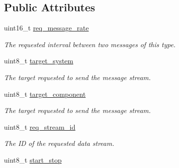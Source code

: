 \subsection*{Public Attributes}
\begin{DoxyCompactItemize}
\item 
\hypertarget{struct____mavlink__request__data__stream__t_a7be3844fa9c61b28b51dbd1fc452c1f0}{uint16\+\_\+t \hyperlink{struct____mavlink__request__data__stream__t_a7be3844fa9c61b28b51dbd1fc452c1f0}{req\+\_\+message\+\_\+rate}}\label{struct____mavlink__request__data__stream__t_a7be3844fa9c61b28b51dbd1fc452c1f0}

\begin{DoxyCompactList}\small\item\em The requested interval between two messages of this type. \end{DoxyCompactList}\item 
\hypertarget{struct____mavlink__request__data__stream__t_ad18b3be12f7ec2056677acd15c286d0a}{uint8\+\_\+t \hyperlink{struct____mavlink__request__data__stream__t_ad18b3be12f7ec2056677acd15c286d0a}{target\+\_\+system}}\label{struct____mavlink__request__data__stream__t_ad18b3be12f7ec2056677acd15c286d0a}

\begin{DoxyCompactList}\small\item\em The target requested to send the message stream. \end{DoxyCompactList}\item 
\hypertarget{struct____mavlink__request__data__stream__t_aab4483f29d41d2e72070bd4295e1395f}{uint8\+\_\+t \hyperlink{struct____mavlink__request__data__stream__t_aab4483f29d41d2e72070bd4295e1395f}{target\+\_\+component}}\label{struct____mavlink__request__data__stream__t_aab4483f29d41d2e72070bd4295e1395f}

\begin{DoxyCompactList}\small\item\em The target requested to send the message stream. \end{DoxyCompactList}\item 
\hypertarget{struct____mavlink__request__data__stream__t_af2333e886475f59842af3fd6ac61c08b}{uint8\+\_\+t \hyperlink{struct____mavlink__request__data__stream__t_af2333e886475f59842af3fd6ac61c08b}{req\+\_\+stream\+\_\+id}}\label{struct____mavlink__request__data__stream__t_af2333e886475f59842af3fd6ac61c08b}

\begin{DoxyCompactList}\small\item\em The I\+D of the requested data stream. \end{DoxyCompactList}\item 
\hypertarget{struct____mavlink__request__data__stream__t_aca2ea67e9e22299721f98ea586d78f07}{uint8\+\_\+t \hyperlink{struct____mavlink__request__data__stream__t_aca2ea67e9e22299721f98ea586d78f07}{start\+\_\+stop}}\label{struct____mavlink__request__data__stream__t_aca2ea67e9e22299721f98ea586d78f07}


\end{DoxyCompactItemize}
